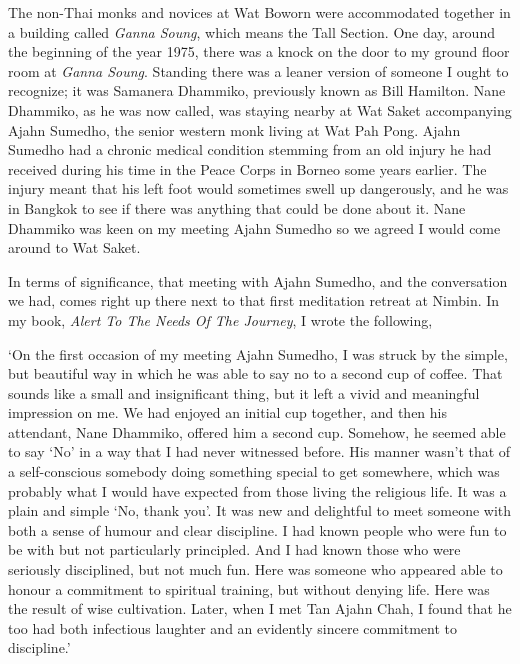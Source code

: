 The non-Thai monks and novices at Wat Boworn were accommodated together
in a building called \emph{Ganna Soung}, which means the Tall Section.
One day, around the beginning of the year 1975, there was a knock on the
door to my ground floor room at \emph{Ganna Soung}. Standing there was a
leaner version of someone I ought to recognize; it was Samanera
Dhammiko, previously known as Bill Hamilton. Nane Dhammiko, as he was
now called, was staying nearby at Wat Saket accompanying Ajahn Sumedho,
the senior western monk living at Wat Pah Pong. Ajahn Sumedho had a
chronic medical condition stemming from an old injury he had received
during his time in the Peace Corps in Borneo some years earlier. The
injury meant that his left foot would sometimes swell up dangerously,
and he was in Bangkok to see if there was anything that could be done
about it. Nane Dhammiko was keen on my meeting Ajahn Sumedho so we
agreed I would come around to Wat Saket.

In terms of significance, that meeting with Ajahn Sumedho, and the
conversation we had, comes right up there next to that first meditation
retreat at Nimbin. In my book, \emph{Alert To The Needs Of The Journey}\cite{alert},
I wrote the following,

`On the first occasion of my meeting Ajahn Sumedho, I was struck by the
simple, but beautiful way in which he was able to say no to a second cup
of coffee. That sounds like a small and insignificant thing, but it left
a vivid and meaningful impression on me. We had enjoyed an initial cup
together, and then his attendant, Nane Dhammiko, offered him a second
cup. Somehow, he seemed able to say `No' in a way that I had never
witnessed before. His manner wasn't that of a self-conscious somebody
doing something special to get somewhere, which was probably what I
would have expected from those living the religious life. It was a plain
and simple `No, thank you'. It was new and delightful to meet someone
with both a sense of humour and clear discipline. I had known people who
were fun to be with but not particularly principled. And I had known
those who were seriously disciplined, but not much fun. Here was someone
who appeared able to honour a commitment to spiritual training, but
without denying life. Here was the result of wise cultivation. Later,
when I met Tan Ajahn Chah, I found that he too had both infectious
laughter and an evidently sincere commitment to discipline.'

